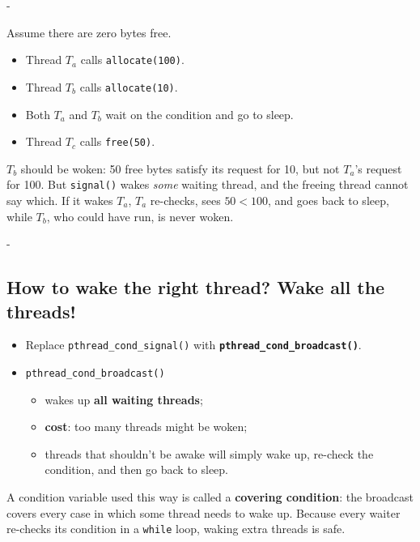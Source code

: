 \documentclass[11pt,a4paper]{article}
\makeatletter
\newcommand{\keepspace}[1]{\par\penalty-100\begingroup
  \setlength{\dimen@}{#1}\dimen@ii\pagegoal\advance\dimen@ii-\pagetotal
  \ifdim\dimen@>\dimen@ii\ifdim\dimen@ii>\z@\vfil\fi\break\fi\endgroup}
\makeatother
\begin{document}
\keepspace{10\baselineskip}
\begin{quizbox}
Assume there are zero bytes free.
\begin{itemize}
  \item Thread \(T_a\) calls \texttt{allocate(100)}.
  \item Thread \(T_b\) calls \texttt{allocate(10)}.
  \item Both \(T_a\) and \(T_b\) wait on the condition and go to sleep.
  \item Thread \(T_c\) calls \texttt{free(50)}.
\end{itemize}
\end{quizbox}

\begin{solbox}[Answer]
\(T_b\) should be woken: 50 free bytes satisfy its request for 10, but not
\(T_a\)'s request for 100. But \texttt{signal()} wakes \emph{some} waiting
thread, and the freeing thread cannot say which. If it wakes \(T_a\),
\(T_a\) re-checks, sees \(50 < 100\), and goes back to sleep, while
\(T_b\), who could have run, is never woken.
\end{solbox}

\keepspace{18\baselineskip}
\subsection{How to wake the right thread? Wake all the threads!}

\begin{keybox}
\begin{itemize}
  \item Replace \texttt{pthread\_cond\_signal()} with
        \textbf{\texttt{pthread\_cond\_broadcast()}}.
  \item \texttt{pthread\_cond\_broadcast()}
    \begin{itemize}
      \item wakes up \textbf{all waiting threads};
      \item \textbf{cost}: too many threads might be woken;
      \item threads that shouldn't be awake will simply wake up, re-check
            the condition, and then go back to sleep.
    \end{itemize}
\end{itemize}
A condition variable used this way is called a \textbf{covering
condition}: the broadcast covers every case in which some thread needs to
wake up. Because every waiter re-checks its condition in a \texttt{while}
loop, waking extra threads is safe.
\end{keybox}
\end{document}
